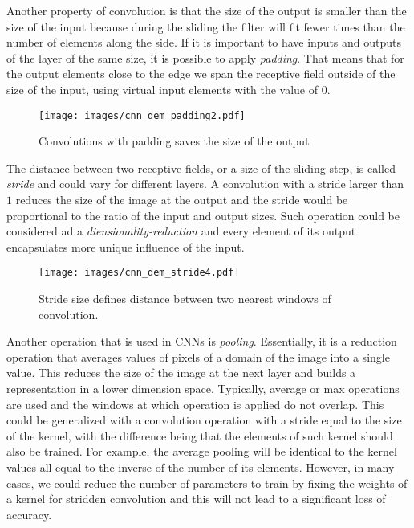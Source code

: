 Another property of convolution is that the size of the output is smaller than the size of the input because during the sliding the filter will fit fewer times than the number of elements along the side.
If it is important to have inputs and outputs of the layer of the same size, it is possible to apply \emph{padding}.
That means that for the output elements close to the edge we span the receptive field outside of the size of the input, using virtual input elements with the value of $0$. 
\begin{figure}[h]
	\centering
	\texttt{[image: images/cnn\_dem\_padding2.pdf]}
	\caption{Convolutions with padding saves the size of the output}
	\label{fig:padding_demo}
\end{figure}
\medskip

The distance between two receptive fields, or a size of the sliding step, is called \textit{stride} and could vary for different layers.
A convolution with a stride larger than $1$ reduces the size of the image at the output and the stride would be proportional to the ratio of the input and output sizes.
Such operation could be considered ad a \emph{diensionality-reduction} and every element of its output encapsulates more unique influence of the input. 
\begin{figure}[h]
	\centering
	\texttt{[image: images/cnn\_dem\_stride4.pdf]}
	\caption{Stride size defines distance between two nearest windows of convolution.}
	\label{fig:stride_demo}
\end{figure}
\medskip

Another operation that is used in CNNs is \textit{pooling}.
Essentially, it is a reduction operation that averages values of pixels of a domain of the image into a single value.
This reduces the size of the image at the next layer and builds a representation in a lower dimension space. 
Typically, average or max operations are used and the windows at which operation is applied do not overlap.
This could be generalized with a convolution operation with a stride equal to the size of the kernel, with the difference being that the elements of such kernel should also be trained.
For example, the average pooling will be identical to the kernel values all equal to the inverse of the number of its elements.
However, in many cases, we could reduce the number of parameters to train by fixing the weights of a kernel for stridden convolution and this will not lead to a significant loss of accuracy\cite{}.
\medskip


